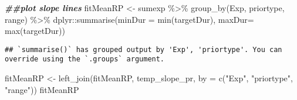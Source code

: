 \documentclass[
]{article}
\newenvironment{Shaded}{\begin{snugshade}}{\end{snugshade}}
\newcommand{\AttributeTok}[1]{\textcolor[rgb]{0.77,0.63,0.00}{#1}}
\newcommand{\DocumentationTok}[1]{\textcolor[rgb]{0.56,0.35,0.01}{\textbf{\textit{#1}}}}
\newcommand{\FloatTok}[1]{\textcolor[rgb]{0.00,0.00,0.81}{#1}}
\newcommand{\FunctionTok}[1]{\textcolor[rgb]{0.00,0.00,0.00}{#1}}
\newcommand{\NormalTok}[1]{#1}
\newcommand{\OtherTok}[1]{\textcolor[rgb]{0.56,0.35,0.01}{#1}}
\newcommand{\SpecialCharTok}[1]{\textcolor[rgb]{0.00,0.00,0.00}{#1}}
\newcommand{\StringTok}[1]{\textcolor[rgb]{0.31,0.60,0.02}{#1}}
\begin{document}
\begin{Shaded}
\end{Shaded}

\begin{Shaded}
\begin{Highlighting}[]
\DocumentationTok{\#\#plot slope lines}
\NormalTok{fitMeanRP }\OtherTok{\textless{}{-}}\NormalTok{ sumexp }\SpecialCharTok{\%\textgreater{}\%} \FunctionTok{group\_by}\NormalTok{(Exp, priortype, range) }\SpecialCharTok{\%\textgreater{}\%}
\NormalTok{  dplyr}\SpecialCharTok{::}\FunctionTok{summarise}\NormalTok{(}\AttributeTok{minDur =} \FunctionTok{min}\NormalTok{(targetDur),}
                   \AttributeTok{maxDur=} \FunctionTok{max}\NormalTok{(targetDur))}
\end{Highlighting}
\end{Shaded}

\begin{verbatim}
## `summarise()` has grouped output by 'Exp', 'priortype'. You can override using the `.groups` argument.
\end{verbatim}

\begin{Shaded}
\begin{Highlighting}[]
\NormalTok{fitMeanRP }\OtherTok{\textless{}{-}} \FunctionTok{left\_join}\NormalTok{(fitMeanRP, temp\_slope\_pr, }\AttributeTok{by =} \FunctionTok{c}\NormalTok{(}\StringTok{"Exp"}\NormalTok{, }\StringTok{"priortype"}\NormalTok{, }\StringTok{"range"}\NormalTok{))}
\NormalTok{fitMeanRP}
\end{Highlighting}
\end{Shaded}
\end{document}
